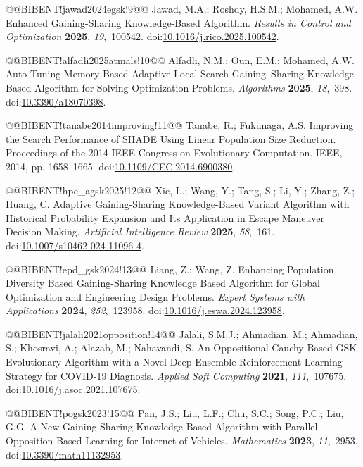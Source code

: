\documentclass[10pt,a4paper]{article}
\begin{document}
@@BIBENT!jawad2024egsk!9@@ Jawad, M.A.; Roshdy, H.S.M.; Mohamed, A.W. Enhanced Gaining-Sharing Knowledge-Based Algorithm. \emph{Results in Control and Optimization} \textbf{2025}, \emph{19},~100542. doi:{\href{https://doi.org/10.1016/j.rico.2025.100542}{10.1016/j.rico.2025.100542}}.

@@BIBENT!alfadli2025atmals!10@@ Alfadli, N.M.; Oun, E.M.; Mohamed, A.W. Auto-Tuning Memory-Based Adaptive Local Search Gaining--Sharing Knowledge-Based Algorithm for Solving Optimization Problems. \emph{Algorithms} \textbf{2025}, \emph{18},~398. doi:{\href{https://doi.org/10.3390/a18070398}{10.3390/a18070398}}.

@@BIBENT!tanabe2014improving!11@@ Tanabe, R.; Fukunaga, A.S. Improving the Search Performance of {SHADE} Using Linear Population Size Reduction. Proceedings of the 2014 IEEE Congress on Evolutionary Computation. IEEE, 2014, pp. 1658--1665. doi:{\href{https://doi.org/10.1109/CEC.2014.6900380}{10.1109/CEC.2014.6900380}}.

@@BIBENT!hpe\_agsk2025!12@@ Xie, L.; Wang, Y.; Tang, S.; Li, Y.; Zhang, Z.; Huang, C. Adaptive Gaining-Sharing Knowledge-Based Variant Algorithm with Historical Probability Expansion and Its Application in Escape Maneuver Decision Making. \emph{Artificial Intelligence Review} \textbf{2025}, \emph{58},~161. doi:{\href{https://doi.org/10.1007/s10462-024-11096-4}{10.1007/s10462-024-11096-4}}.

@@BIBENT!epd\_gsk2024!13@@ Liang, Z.; Wang, Z. Enhancing Population Diversity Based Gaining-Sharing Knowledge Based Algorithm for Global Optimization and Engineering Design Problems. \emph{Expert Systems with Applications} \textbf{2024}, \emph{252},~123958. doi:{\href{https://doi.org/10.1016/j.eswa.2024.123958}{10.1016/j.eswa.2024.123958}}.

@@BIBENT!jalali2021opposition!14@@ Jalali, S.M.J.; Ahmadian, M.; Ahmadian, S.; Khosravi, A.; Alazab, M.; Nahavandi, S. An Oppositional-{C}auchy Based {GSK} Evolutionary Algorithm with a Novel Deep Ensemble Reinforcement Learning Strategy for {COVID}-19 Diagnosis. \emph{Applied Soft Computing} \textbf{2021}, \emph{111},~107675. doi:{\href{https://doi.org/10.1016/j.asoc.2021.107675}{10.1016/j.asoc.2021.107675}}.

@@BIBENT!pogsk2023!15@@ Pan, J.S.; Liu, L.F.; Chu, S.C.; Song, P.C.; Liu, G.G. A New Gaining-Sharing Knowledge Based Algorithm with Parallel Opposition-Based Learning for Internet of Vehicles. \emph{Mathematics} \textbf{2023}, \emph{11},~2953. doi:{\href{https://doi.org/10.3390/math11132953}{10.3390/math11132953}}.
\end{document}
